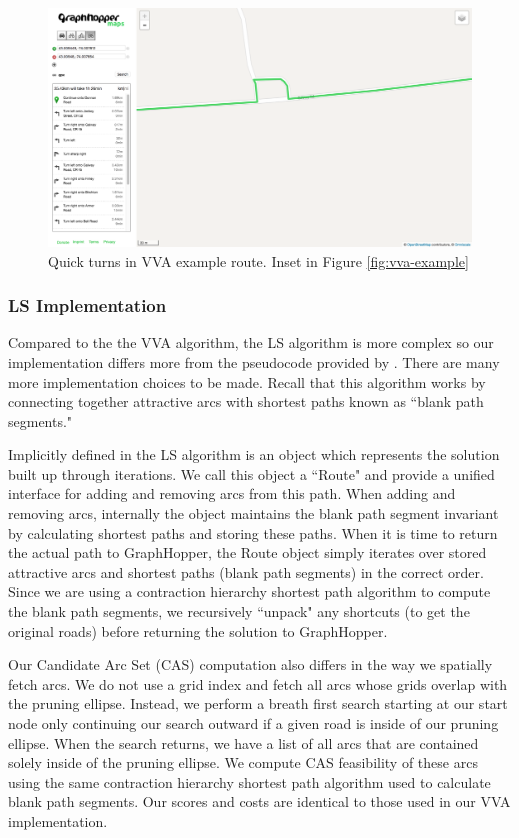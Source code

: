 \documentclass[honors]{union-cs-thesis}
\begin{document}
\begin{figure}
    \begin{center}
        \includegraphics[width=\textwidth]{figs/vva-route-turn}
    \end{center}
    \caption{Quick turns in VVA example route. Inset in Figure \ref{fig:vva-example}}
    \label{fig:vva-example-turn}
\end{figure}


\subsubsection{LS Implementation}
Compared to the the VVA algorithm, the LS algorithm is more complex so our implementation differs more from the pseudocode provided by \citeauthor{lu2015arc}. There are many more implementation choices to be made. Recall that this algorithm works by connecting together attractive arcs with shortest paths known as ``blank path segments." 

Implicitly defined in the LS algorithm is an object which represents the solution built up through iterations. We call this object a ``Route" and provide a unified interface for adding and removing arcs from this path. When adding and removing arcs, internally the object maintains the blank path segment invariant by calculating shortest paths and storing these paths. When it is time to return the actual path to GraphHopper, the Route object simply iterates over stored attractive arcs and shortest paths (blank path segments) in the correct order. Since we are using a contraction hierarchy shortest path algorithm to compute the blank path segments, we recursively ``unpack" any shortcuts (to get the original roads) before returning the solution to GraphHopper. 

Our Candidate Arc Set (CAS) computation also differs in the way we spatially fetch arcs. We do not use a grid index and fetch all arcs whose grids overlap with the pruning ellipse.  Instead, we perform a breath first search starting at our start node only continuing our search outward if a given road is inside of our pruning ellipse. When the search returns, we have a list of all arcs that are contained solely inside of the pruning ellipse. We compute CAS feasibility of these arcs using the same contraction hierarchy shortest path algorithm used to calculate blank path segments. Our scores and costs are identical to those used in our VVA implementation.
\end{document}
